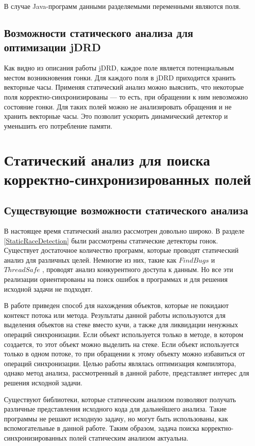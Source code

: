 В случае Java-программ данными разделяемыми переменными являются поля. 


\subsection{Возможности статического анализа для оптимизации jDRD}
Как видно из описания работы jDRD, каждое поле является потенциальным местом возникновения гонки.  
Для каждого поля в jDRD приходится хранить векторные часы. Применяя статический анализ можно выяснить, что некоторые поля корректно-синхронизированы --- то есть, при обращении к ним невозможно состояние гонки. Для таких полей можно не анализировать обращения и не хранить векторные часы. Это позволит ускорить динамический детектор и уменьшить его потребление памяти. 

\section{Статический анализ для поиска корректно-синхронизированных полей}

\subsection{Существующие возможности статического анализа}
В настоящее время статический анализ рассмотрен довольно широко.
В разделе \ref{StaticRaceDetection} были рассмотрены статические детекторы гонок. Существует достаточное количество программ, которые проводят статический анализ для различных целей. Немногие из них, такие как $FindBugs$ \cite{FindBugs} и $ThreadSafe$ \cite{ThreadSafe}, проводят анализ конкурентного доступа к данным. Но все эти реализации ориентированы на поиск ошибок в программах и для решения исходной задачи не подходят.

В работе \cite{Whaley:1999:CPE:320385.320400} приведен способ для нахождения объектов, которые не покидают контекст потока или метода. Результаты данной работы используются для выделения объектов на стеке вместо кучи, а также для ликвидации ненужных операций синхронизации.
 Если объект используется только в методе, в котором создается, то этот объект можно выделить на стеке. Если объект используется только в одном потоке, то при обращении к этому объекту можно избавиться от операций синхронизации. Целью работы являлась оптимизация компилятора, однако метод анализа, рассмотренный в данной работе,  представляет интерес для решения исходной задачи.

Существуют библиотеки, которые статическим анализом позволяют получать различные представления исходного кода для дальнейшего анализа. Такие программы не решают исходную задачу, но могут быть использованы, как вспомогательные в данной работе. 
Таким образом, задача поиска корректно-синхронизированных полей статическим анализом актуальна.

